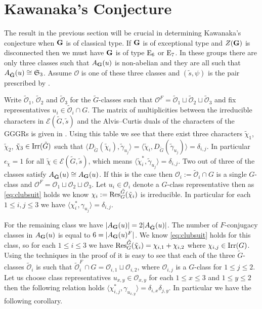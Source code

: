 \documentclass{jt-calcs}
\renewcommand{\cref}{\Cref}
\begin{document}
\section{Kawanaka's Conjecture}\label{sec:conjecture}
The result in the previous section will be crucial in determining Kawanaka's conjecture when $\mathbf{G}$ is of classical type. If $\mathbf{G}$ is of exceptional type and $Z(\mathbf{G})$ is disconnected then we must have $\mathbf{G}$ is of type $\operatorname{E}_6$ or $\operatorname{E}_7$. In these groups there are only three classes such that $A_{\mathbf{G}}(u)$ is non-abelian and they are all such that $A_{\tilde{\mathbf{G}}}(u) \cong \mathfrak{S}_3$. Assume $\mathcal{O}$ is one of these three classes and $(\tilde{s},\psi)$ is the pair prescribed by \cref{prop:A}.

Write $\mathcal{\tilde{O}}_1$, $\mathcal{\tilde{O}}_2$ and $\mathcal{\tilde{O}}_3$ for the $\tilde{G}$-classes such that $\mathcal{O}^F = \mathcal{\tilde{O}}_1 \sqcup \mathcal{\tilde{O}}_2 \sqcup \mathcal{\tilde{O}}_3$ and fix representatives $u_i \in \mathcal{\tilde{O}}_i \cap G$. The matrix of multiplicities between the irreducible characters in $\mathcal{E}(\tilde{G},\tilde{s})$ and the Alvis--Curtis duals of the characters of the GGGRs is given in \cite[Proposition 6.7]{geck:1999:character-sheaves-and-GGGRs}. Using this table we see that there exist three characters $\tilde{\chi}_1$, $\tilde{\chi}_2$, $\tilde{\chi}_3 \in \operatorname{Irr}(\tilde{G})$ such that $\langle D_{\tilde{G}}(\tilde{\chi}_i),\tilde{\gamma}_{u_j}\rangle = \langle\tilde{\chi}_i,D_{\tilde{G}}(\tilde{\gamma}_{u_j})\rangle = \delta_{i,j}$. In particular $\epsilon_{\tilde{\chi}} = 1$ for all $\tilde{\chi} \in \mathcal{E}(\tilde{G},\tilde{s})$, which means $\langle\tilde{\chi}_i^*,\tilde{\gamma}_{u_j}\rangle = \delta_{i,j}$. Two out of three of the classes satisfy $A_{\tilde{\mathbf{G}}}(u) \cong A_{\mathbf{G}}(u)$. If this is the case then $\mathcal{O}_i := \mathcal{\tilde{O}}_i \cap G$ is a single $G$-class and $\mathcal{O}^F = \mathcal{O}_1\sqcup\mathcal{O}_2\sqcup\mathcal{O}_3$. Let $u_i \in \mathcal{O}_i$ denote a $G$-class representative then as \eqref{eq:clubsuit} holds we know $\chi_i := \operatorname{Res}_G^{\tilde{G}}(\tilde{\chi}_i)$ is irreducible. In particular for each $1 \leqslant i,j \leqslant 3$ we have $\langle\chi_i^*,\gamma_{u_j}\rangle = \delta_{i,j}$.

For the remaining class we have $|A_{\mathbf{G}}(u)| = 2|A_{\tilde{\mathbf{G}}}(u)|$. The number of $F$-conjugacy classes in $A_{\mathbf{G}}(u)$ is equal to $6 = |A_{\mathbf{G}}(u)^F|$. We know \eqref{eq:clubsuit} holds for this class, so for each $1 \leqslant i \leqslant 3$ we have $\operatorname{Res}_G^{\tilde{G}}(\tilde{\chi}_i) = \chi_{i,1} + \chi_{i,2}$ where $\chi_{i,j} \in \operatorname{Irr}(G)$. Using the techniques in the proof of \cref{prop:inner-prod} it is easy to see that each of the three $\tilde{G}$-classes $\mathcal{\tilde{O}}_i$ is such that $\mathcal{\tilde{O}}_i^F \cap G = \mathcal{O}_{i,1}\sqcup \mathcal{O}_{i,2}$, where $\mathcal{O}_{i,j}$ is a $G$-class for $1 \leqslant j \leqslant 2$. Let us choose class representatives $u_{x,y} \in \mathcal{O}_{x,y}$ for each $1 \leqslant x \leqslant 3$ and $1 \leqslant y \leqslant 2$ then the following relation holds $\langle\chi_{i,j}^*, \gamma_{u_{x,y}}\rangle = \delta_{i,x}\delta_{j,y}$. In particular we have the following corollary.
\end{document}
